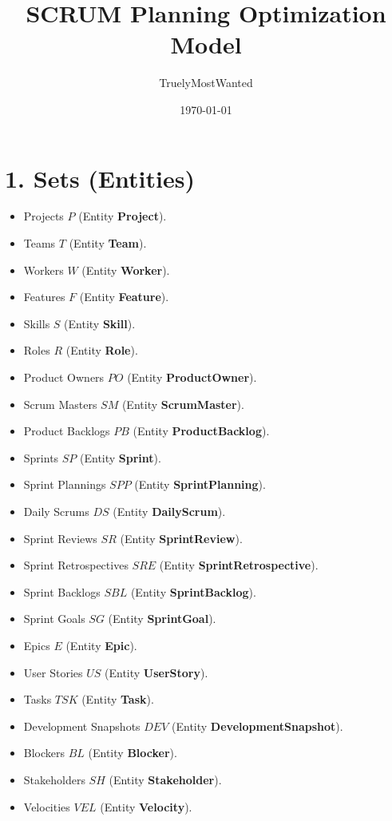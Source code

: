 \documentclass[11pt]{article}
\title{SCRUM Planning Optimization Model}
\author{TruelyMostWanted}
\date{\today}
\begin{document}
\maketitle
\tableofcontents
\newpage

\section{1. Sets (Entities)}
\begin{itemize}
  \item Projects $P$ (Entity \textbf{Project}).
  \item Teams $T$ (Entity \textbf{Team}).
  \item Workers $W$ (Entity \textbf{Worker}).
  \item Features $F$ (Entity \textbf{Feature}).
  \item Skills $S$ (Entity \textbf{Skill}).
  \item Roles $R$ (Entity \textbf{Role}).
  \item Product Owners $PO$ (Entity \textbf{ProductOwner}).
  \item Scrum Masters $SM$ (Entity \textbf{ScrumMaster}).
  \item Product Backlogs $PB$ (Entity \textbf{ProductBacklog}).
  \item Sprints $SP$ (Entity \textbf{Sprint}).
  \item Sprint Plannings $SPP$ (Entity \textbf{SprintPlanning}).
  \item Daily Scrums $DS$ (Entity \textbf{DailyScrum}).
  \item Sprint Reviews $SR$ (Entity \textbf{SprintReview}).
  \item Sprint Retrospectives $SRE$ (Entity \textbf{SprintRetrospective}).
  \item Sprint Backlogs $SBL$ (Entity \textbf{SprintBacklog}).
  \item Sprint Goals $SG$ (Entity \textbf{SprintGoal}).
  \item Epics $E$ (Entity \textbf{Epic}).
  \item User Stories $US$ (Entity \textbf{UserStory}).
  \item Tasks $TSK$ (Entity \textbf{Task}).
  \item Development Snapshots $DEV$ (Entity \textbf{DevelopmentSnapshot}).
  \item Blockers $BL$ (Entity \textbf{Blocker}).
  \item Stakeholders $SH$ (Entity \textbf{Stakeholder}).
  \item Velocities $VEL$ (Entity \textbf{Velocity}).

\end{itemize}
\end{document}
